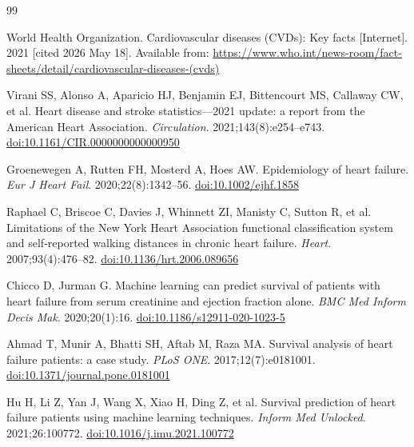 \documentclass[12pt, a4paper]{article}
\begin{document}

\begin{thebibliography}{99}

World Health Organization.
\newblock Cardiovascular diseases ({CVDs}): Key facts [Internet]. 2021
  [cited 2026 May 18].
\newblock Available from:
  \url{https://www.who.int/news-room/fact-sheets/detail/cardiovascular-diseases-(cvds)}

Virani SS, Alonso A, Aparicio HJ, Benjamin EJ, Bittencourt MS, Callaway CW,
  et al.
\newblock Heart disease and stroke statistics---2021 update: a report from the
  {American Heart Association}.
\newblock \emph{Circulation}. 2021;143(8):e254--e743.
\newblock \href{https://doi.org/10.1161/CIR.0000000000000950}{doi:10.1161/CIR.0000000000000950}

Groenewegen A, Rutten FH, Mosterd A, Hoes AW.
\newblock Epidemiology of heart failure.
\newblock \emph{Eur J Heart Fail}. 2020;22(8):1342--56.
\newblock \href{https://doi.org/10.1002/ejhf.1858}{doi:10.1002/ejhf.1858}

Raphael C, Briscoe C, Davies J, Whinnett ZI, Manisty C, Sutton R, et al.
\newblock Limitations of the {New York Heart Association} functional
  classification system and self-reported walking distances in chronic heart
  failure.
\newblock \emph{Heart}. 2007;93(4):476--82.
\newblock \href{https://doi.org/10.1136/hrt.2006.089656}{doi:10.1136/hrt.2006.089656}

Chicco D, Jurman G.
\newblock Machine learning can predict survival of patients with heart failure
  from serum creatinine and ejection fraction alone.
\newblock \emph{BMC Med Inform Decis Mak}. 2020;20(1):16.
\newblock \href{https://doi.org/10.1186/s12911-020-1023-5}{doi:10.1186/s12911-020-1023-5}

Ahmad T, Munir A, Bhatti SH, Aftab M, Raza MA.
\newblock Survival analysis of heart failure patients: a case study.
\newblock \emph{PLoS ONE}. 2017;12(7):e0181001.
\newblock \href{https://doi.org/10.1371/journal.pone.0181001}{doi:10.1371/journal.pone.0181001}

Hu H, Li Z, Yan J, Wang X, Xiao H, Ding Z, et al.
\newblock Survival prediction of heart failure patients using machine learning
  techniques.
\newblock \emph{Inform Med Unlocked}. 2021;26:100772.
\newblock \href{https://doi.org/10.1016/j.imu.2021.100772}{doi:10.1016/j.imu.2021.100772}


\end{thebibliography}
\end{document}
